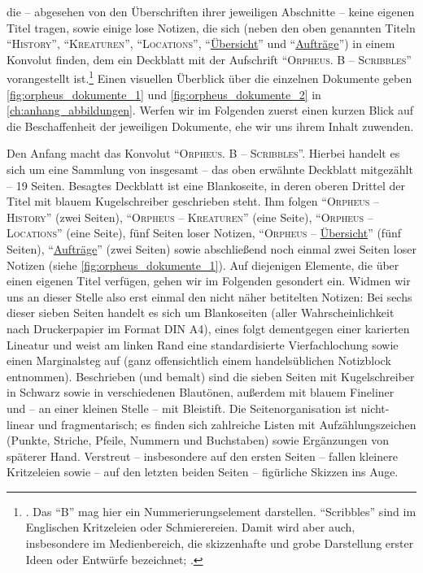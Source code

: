 \documentclass[a5paper,pagesize,numbers=noenddot]{scrbook}
\begin{document}
\noindent die -- abgesehen von den Überschriften ihrer jeweiligen Abschnitte -- keine eigenen Titel tragen, sowie einige lose Notizen, die sich (neben den oben genannten Titeln \enquote{\textsc{History}}, \enquote{\textsc{Kreaturen}}, \enquote{\textsc{Locations}}, \enquote{\uline{Übersicht}} und \enquote{\uline{Aufträge}}) in einem Konvolut finden, dem ein Deckblatt mit der Aufschrift \enquote{\textsc{Orpheus. B -- Scribbles}} vorangestellt ist.\footnote{\autocite{orpheus_b_scribbles}. Das \enquote{B} mag hier ein Nummerierungselement darstellen. \enquote{Scribbles} sind im Englischen Kritzeleien oder Schmierereien. Damit wird aber auch, insbesondere im Medienbereich, die skizzenhafte und grobe Darstellung erster Ideen oder Entwürfe bezeichnet; \autocite[vgl.][S.~128]{seebohn_werbung_2011}.} %
Einen visuellen Überblick über die einzelnen Dokumente geben \autoref{fig:orpheus_dokumente_1} und \autoref{fig:orpheus_dokumente_2} in \autoref{ch:anhang_abbildungen}.
Werfen wir im Folgenden zuerst einen kurzen Blick auf die Beschaffenheit der jeweiligen Dokumente, ehe wir uns ihrem Inhalt zuwenden.


Den Anfang macht das Konvolut \enquote{\textsc{Orpheus. B -- Scribbles}}.
Hierbei handelt es sich um eine Sammlung von insgesamt -- das oben erwähnte Deckblatt mitgezählt -- 19 Seiten.
Besagtes Deckblatt ist eine Blankoseite, in deren oberen Drittel der Titel mit blauem Kugelschreiber geschrieben steht.
Ihm folgen \enquote{\textsc{Orpheus -- History}} (zwei Seiten), \enquote{\textsc{Orpheus -- Kreaturen}} (eine Seite), \enquote{\textsc{Orpheus -- Locations}} (eine Seite), fünf Seiten loser Notizen, \enquote{\textsc{Orpheus} -- \uline{Übersicht}} (fünf Seiten), \enquote{\uline{Aufträge}} (zwei Seiten) sowie abschließend noch einmal zwei Seiten loser Notizen (siehe \autoref{fig:orpheus_dokumente_1}).
Auf diejenigen Elemente, die über einen eigenen Titel verfügen, gehen wir im Folgenden gesondert ein.
Widmen wir uns an dieser Stelle also erst einmal den nicht näher betitelten Notizen:
Bei sechs dieser sieben Seiten handelt es sich um Blankoseiten (aller Wahrscheinlichkeit nach Druckerpapier im Format DIN A4), eines folgt dementgegen einer karierten Lineatur und weist am linken Rand eine standardisierte Vierfachlochung sowie einen Marginalsteg auf (ganz offensichtlich einem handelsüblichen Notizblock entnommen).
Beschrieben (und bemalt) sind die sieben Seiten mit Kugelschreiber in Schwarz sowie in verschiedenen Blautönen, außerdem mit blauem Fineliner und -- an einer kleinen Stelle -- mit Bleistift.
Die Seitenorganisation ist nicht-linear und fragmentarisch; es finden sich zahlreiche Listen mit Aufzählungszeichen (Punkte, Striche, Pfeile, Nummern und Buchstaben) sowie Ergänzungen von späterer Hand.
Verstreut -- insbesondere auf den ersten Seiten -- fallen kleinere Kritzeleien sowie -- auf den letzten beiden Seiten -- figürliche Skizzen ins Auge.
\end{document}
